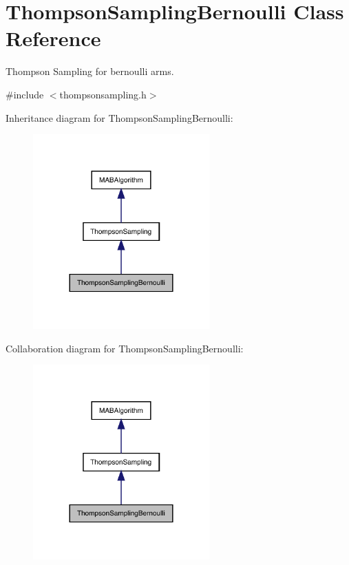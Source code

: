 \hypertarget{class_thompson_sampling_bernoulli}{}\section{Thompson\+Sampling\+Bernoulli Class Reference}
\label{class_thompson_sampling_bernoulli}


Thompson Sampling for bernoulli arms.  




{\ttfamily \#include $<$thompsonsampling.\+h$>$}



Inheritance diagram for Thompson\+Sampling\+Bernoulli\+:
\nopagebreak
\begin{figure}[H]
\begin{center}
\leavevmode
\includegraphics[width=192pt]{class_thompson_sampling_bernoulli__inherit__graph}
\end{center}
\end{figure}


Collaboration diagram for Thompson\+Sampling\+Bernoulli\+:
\nopagebreak
\begin{figure}[H]
\begin{center}
\leavevmode
\includegraphics[width=192pt]{class_thompson_sampling_bernoulli__coll__graph}
\end{center}
\end{figure}
